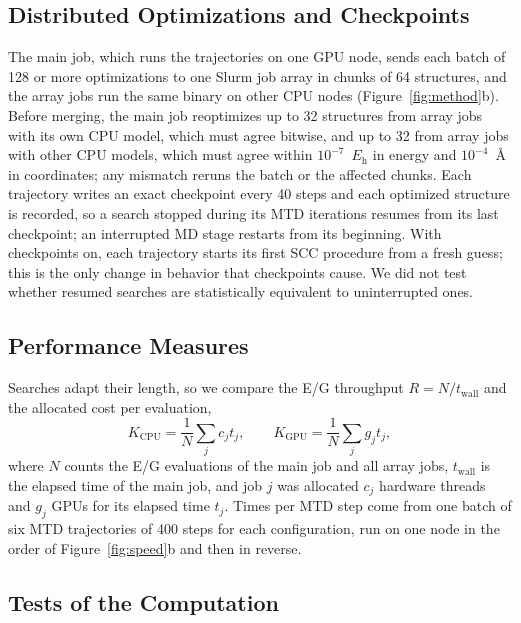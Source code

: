 \documentclass[journal=jctcce,manuscript=article]{achemso}
\newcommand{\Eh}{\ensuremath{E_\mathrm{h}}}
\begin{document}
\subsection{Distributed Optimizations and Checkpoints}
\label{sec:dist}

The main job, which runs the trajectories on one GPU node, sends each batch of 128 or more optimizations to one Slurm job array\cite{slurm} in chunks of 64 structures, and the array jobs run the same binary on other CPU nodes (Figure~\ref{fig:method}b). Before merging, the main job reoptimizes up to 32 structures from array jobs with its own CPU model, which must agree bitwise, and up to 32 from array jobs with other CPU models, which must agree within $10^{-7}$~\Eh{} in energy and $10^{-4}$~\AA{} in coordinates; any mismatch reruns the batch or the affected chunks. Each trajectory writes an exact checkpoint every 40 steps and each optimized structure is recorded, so a search stopped during its MTD iterations resumes from its last checkpoint; an interrupted MD stage restarts from its beginning. With checkpoints on, each trajectory starts its first SCC procedure from a fresh guess; this is the only change in behavior that checkpoints cause. We did not test whether resumed searches are statistically equivalent to uninterrupted ones.

\subsection{Performance Measures}
\label{sec:measures}

Searches adapt their length, so we compare the E/G throughput $R = N/t_\mathrm{wall}$ and the allocated cost per evaluation,
\begin{equation}
K_\mathrm{CPU} = \frac{1}{N}\sum_j c_j t_j, \qquad K_\mathrm{GPU} = \frac{1}{N}\sum_j g_j t_j,
\label{eq:cost}
\end{equation}
where $N$ counts the E/G evaluations of the main job and all array jobs, $t_\mathrm{wall}$ is the elapsed time of the main job, and job $j$ was allocated $c_j$ hardware threads and $g_j$ GPUs for its elapsed time $t_j$. Times per MTD step come from one batch of six MTD trajectories of 400 steps for each configuration, run on one node in the order of Figure~\ref{fig:speed}b and then in reverse.

\subsection{Tests of the Computation}
\label{sec:tests}
\end{document}

